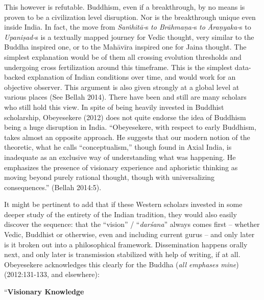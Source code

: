 This however is refutable. Buddhism, even if a breakthrough, by no means is proven to be a civilization level disruption. Nor is the breakthrough unique even inside India. In fact, the move from \textit{Saṁhitā-}s\textit{ to Brāhmaṇa-}s\textit{ to} \textit{Āraṇyaka-}s to \textit{Upaniṣad-}s is a textually mapped journey for Vedic thought, very similar to the Buddha inspired one, or to the Mahāvīra inspired one for Jaina thought. The simplest explanation would be of them all crossing evolution thresholds and undergoing cross fertilization around this timeframe. This is the simplest data-backed explanation of Indian conditions over time, and would work for an objective observer. This argument is also given strongly at a global level at various places (See Bellah 2014). There have been and still are many scholars who still hold this view. In spite of being heavily invested in Buddhist scholarship, Obeyesekere (2012) does not quite endorse the idea of Buddhism being a huge disruption in India. “Obeyesekere, with respect to early Buddhism, takes almost an opposite approach. He suggests that our modern notion of the theoretic, what he calls “conceptualism,” though found in Axial India, is inadequate as an exclusive way of understanding what was happening. He emphasizes the presence of visionary experience and aphoristic thinking as moving beyond purely rational thought, though with universalizing consequences.” (Bellah 2014:5).

It might be pertinent to add that if these Western scholars invested in some deeper study of the entirety of the Indian tradition, they would also easily discover the sequence: that the “vision” / “\textit{darśana}” always comes first – whether Vedic, Buddhist or otherwise, even and including current gurus – and only later is it broken out into a philosophical framework. Dissemination happens orally next, and only later is transmission stabilized with help of writing, if at all. Obeyesekere acknowledges this clearly for the Buddha (\textit{all emphases mine}) (2012:131-133, and elsewhere):

\begin{myquote}
“\textbf{Visionary Knowledge}
\end{myquote}

